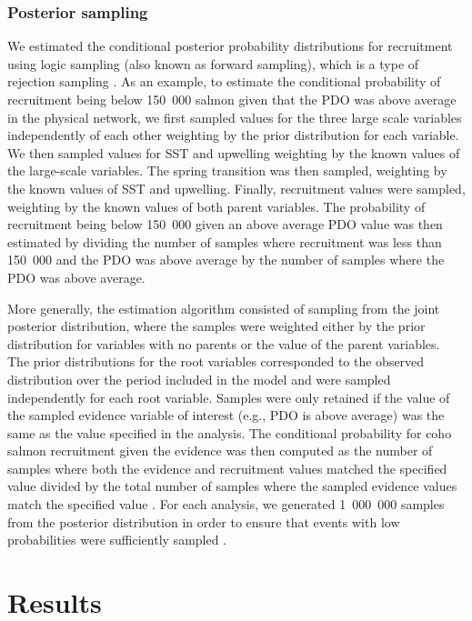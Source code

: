 \subsubsection{Posterior sampling}

We estimated the conditional posterior probability distributions for recruitment
using logic sampling (also known as forward sampling), which is a type of
rejection sampling \citep{Henrion1988a, Korb2004a}. As an example, to estimate
the conditional probability of recruitment being below 150~000 salmon given that
the PDO was above average in the physical network, we first sampled values for
the three large scale variables independently of each other weighting by the
prior distribution for each variable. We then sampled values for SST and
upwelling weighting by the known values of the large-scale variables.  The
spring transition was then sampled, weighting by the known values of SST and
upwelling. Finally, recruitment values were sampled, weighting by the known
values of both parent variables. The probability of recruitment being below
150~000 given an above average PDO value was then estimated by dividing the
number of samples where recruitment was less than 150~000 and the PDO was above
average by the number of samples where the PDO was above average.

More generally, the estimation algorithm consisted of sampling from the joint
posterior distribution, where the samples were weighted either by the prior
distribution for variables with no parents or the value of the parent variables.
The prior distributions for the root variables corresponded to the observed
distribution over the period included in the model and were sampled
independently for each root variable. Samples were only retained if the value of
the sampled evidence variable of interest (e.g., PDO is above average) was the
same as the value specified in the analysis. The conditional probability for
coho salmon recruitment given the evidence was then computed as the number of
samples where both the evidence and recruitment values matched the specified
value divided by the total number of samples where the sampled evidence values
match the specified value \citep{Henrion1988a}. For each analysis, we generated
1~000~000 samples from the posterior distribution in order to ensure that events
with low probabilities were sufficiently sampled \citep{Koller2009a}.



\section{Results}

